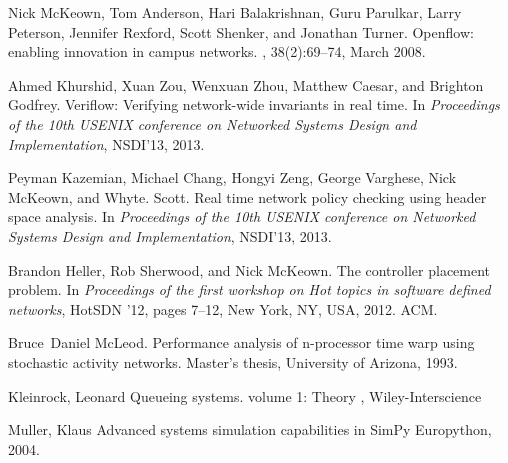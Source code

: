 \documentclass[conference]{IEEEtran}
\begin{document}


%
%
%
\begin{thebibliography}{1}

Nick McKeown, Tom Anderson, Hari Balakrishnan, Guru Parulkar, Larry Peterson,
  Jennifer Rexford, Scott Shenker, and Jonathan Turner.
\newblock Openflow: enabling innovation in campus networks.
, 38(2):69--74, March 2008.


Ahmed Khurshid, Xuan Zou, Wenxuan Zhou, Matthew Caesar, and Brighton Godfrey.
\newblock Veriflow: Verifying network-wide invariants in real time.
\newblock In {\em Proceedings of the 10th USENIX conference on Networked
  Systems Design and Implementation}, NSDI'13, 2013.


Peyman Kazemian, Michael Chang, Hongyi Zeng, George Varghese, Nick McKeown, and
  Whyte. Scott.
\newblock Real time network policy checking using header space analysis.
\newblock In {\em Proceedings of the 10th USENIX conference on Networked
  Systems Design and Implementation}, NSDI'13, 2013.
  

Brandon Heller, Rob Sherwood, and Nick McKeown.
\newblock The controller placement problem.
\newblock In {\em Proceedings of the first workshop on Hot topics in software
  defined networks}, HotSDN '12, pages 7--12, New York, NY, USA, 2012. ACM.
  

Bruce~Daniel McLeod.
\newblock Performance analysis of n-processor time warp using stochastic
  activity networks.
\newblock Master's thesis, University of Arizona, 1993.
  

Kleinrock, Leonard
\newblock Queueing systems. volume 1: Theory
, Wiley-Interscience

Muller, Klaus
\newblock Advanced systems simulation capabilities in SimPy
\newblock Europython, 2004.

  
\end{thebibliography}






\end{document}

